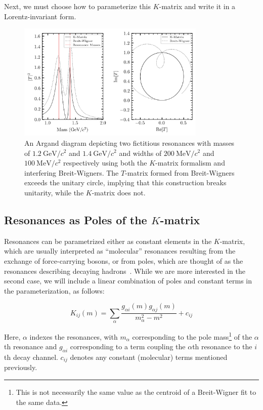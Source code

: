 Next, we must choose how to parameterize this $K$-matrix and write it in a Lorentz-invariant form.

\begin{figure}
  \begin{center}
    \includegraphics[width=0.8\textwidth]{figures/argand_diagram.png}
  \end{center}
  \caption{An Argand diagram depicting two fictitious resonances with masses of $\SI{1.2}{\giga\eV}/c^2$ and $\SI{1.4}{\giga\eV}/c^2$ and widths of $\SI{200}{\mega\eV}/c^2$ and $\SI{100}{\mega\eV}/c^2$ respectively using both the $K$-matrix formalism and interfering Breit-Wigners. The $T$-matrix formed from Breit-Wigners exceeds the unitary circle, implying that this construction breaks unitarity, while the $K$-matrix does not.}\label{fig:argand-diagram}
\end{figure}

\subsection{Resonances as Poles of the $K$-matrix}

Resonances can be parametrized either as constant elements in the $K$-matrix, which are usually interpreted as ``molecular'' resonances resulting from the exchange of force-carrying bosons, or from poles, which are thought of as the resonances describing decaying hadrons~\cite{Au1987}. While we are more interested in the second case, we will include a linear combination of poles and constant terms in the parameterization, as follows:

\begin{equation}
  K_{ij}(m) = \sum_{\alpha} \frac{g_{\alpha i}(m) g_{\alpha j}(m)}{m_\alpha^2 - m^2} + c_{ij}
  \label{eq:k-matrix-parameterization}
\end{equation}

Here, $\alpha$ indexes the resonances, with $m_\alpha$ corresponding to the pole mass\footnote{This is not necessarily the same value as the centroid of a Breit-Wigner fit to the same data.} of the $\alpha$th resonance and $g_{\alpha i}$ corresponding to a term coupling the $\alpha$th resonance to the $i$th decay channel. $c_{ij}$ denotes any constant (molecular) terms mentioned previously.


